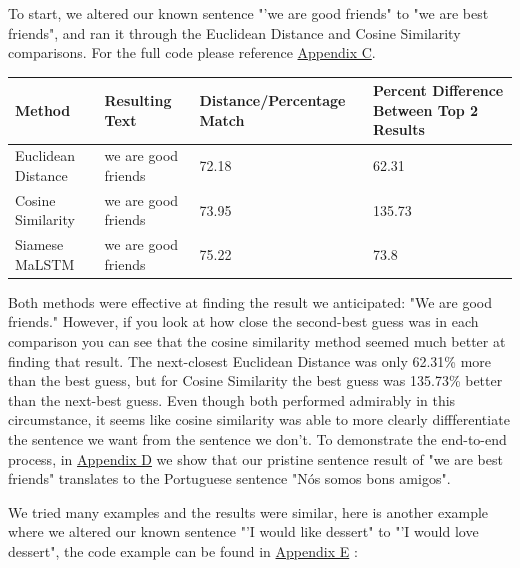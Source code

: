 \documentclass[runningheads]{llncs}
\begin{document}
To start, we altered our known sentence "'we are good friends" to "we are best friends", and ran it through the Euclidean Distance and Cosine Similarity comparisons. For the full code please reference \hyperlink{Appendix C}{Appendix C}.

\vspace{10 mm}
	\begin{minipage}{\linewidth}
		\begin{center}
			\begin{tabular}{| l | l | l | l |}
			  \hline			
			  Method & Resulting Text & Distance/Percentage Match & Percent Difference Between Top 2 Results \\
			  \hline			
			  Euclidean Distance & we are good friends & 72.18 & 62.31 \\
			  \hline			
			  Cosine Similarity & we are good friends & 73.95 & 135.73 \\
			  \hline  
			  Siamese MaLSTM & we are good friends & 75.22 & 73.8 \\
			  \hline
			\end{tabular}
		\end{center}
	\end{minipage}
	\afterpage{\clearpage}
\vspace{10 mm}

	Both methods were effective at finding the result we anticipated: "We are good friends." However, if you look at how close the second-best guess was in each comparison you can see that the cosine similarity method seemed much better at finding that result. The next-closest Euclidean Distance was only 62.31\% more than the best guess, but for Cosine Similarity the best guess was 135.73\% better than the next-best guess. Even though both performed admirably in this circumstance, it seems like cosine similarity was able to more clearly diffferentiate the sentence we want from the sentence we don't.  To demonstrate the end-to-end process, in \hyperlink{Appendix D}{Appendix D} we show that our pristine sentence result of "we are best friends" translates to the Portuguese sentence "Nós somos bons amigos".

	We tried many examples and the results were similar, here is another example where we altered our known sentence "'I would like dessert" to "'I would love dessert", the code example can be found in \hyperlink{Appendix E}{Appendix E} :
\end{document}
